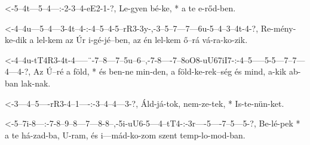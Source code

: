 


  {<-5--4t---5--4---:-2-3--4-eE2-1-?,}
  {  Le-gyen bé-ke, * a te e-rőd-ben.}

  {<-4--4u---5--4---3-4t--4-:-4--5--4-5--rR3-3y-,-3--5--7---7---6u-5--4--3--4t-4-?,}
  {  Re-mény-ke-dik a lel-kem az Úr i-gé-jé--ben, az én lel-kem ő--rá vá-ra-ko-zik.}




  {<-4--4u-tT4R3-4t-4-----¨-7--8---7--5u--6--,-7-8----7--8oO8-uU67iI7-:-4--5-----5-5---7--7---4---4-?,}
  {  Az Ú--ré    a  föld, * és ben-ne min-den, a föld-ke-rek--ség       és mind, a-kik ab-ban lak-nak.}

  {<-3---4--5----rR3-4--1----:-3--4--4---3-?,}
  {  Áld-já-tok, nem-ze-tek, * Is-te-nün-ket.}

  {<-5--7i-8---:-7-8--9--8---7---8-8--,-5i-uU6-5---4--tT4-:-3r----5----7--5---5-?,}
  {  Be-lé-pek * a te há-zad-ba, U-ram, és i---mád-ko-zom   szent temp-lo-mod-ban.}